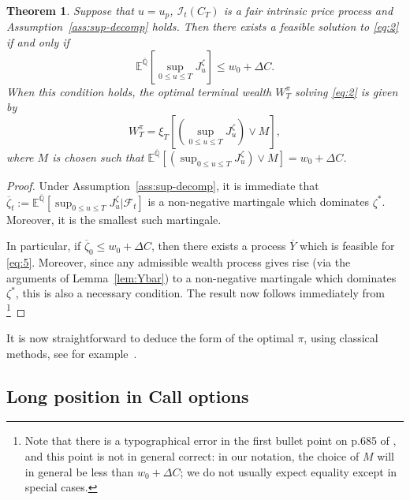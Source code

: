 \documentclass[a4paper]{amsart}
\newtheorem{theorem}{Theorem}[section]
\theoremstyle{definition}
\theoremstyle{remark}
\numberwithin{equation}{section}
\newcommand{\E}{\mathbb{E}}
\newcommand{\Fc}{\mathcal{F}}
\newcommand{\Ebq}[1]{\E^{\bQ}\left[#1\right]}
\newcommand{\ol}{\overline}
\newcommand{\In}{\mathcal{I}} %
\newcommand{\bQ}{\ol{\mathbb{Q}}}
\begin{document}
\begin{theorem} \label{thm:main_decomp}
  Suppose that $u = u_p$, $\In_t(C_T)$ is a fair intrinsic price process and Assumption~\ref{ass:sup-decomp} holds. Then there exists a feasible solution to \eqref{eq:2} if and only if
  \begin{equation*}
    \Ebq{\sup_{0 \le u \le T} J_u^\zeta} \le w_0 + \Delta C .
  \end{equation*}
  When this condition holds, the optimal terminal wealth $W_T^\pi$ solving \eqref{eq:2} is given by
  \begin{equation*}
    W_T^\pi = \xi_T\left[ \left( \sup_{0 \le u \le T} J_u^\zeta\right) \vee M\right],
  \end{equation*}
  where $M$ is chosen such that $\Ebq{\left( \sup_{0 \le u \le T} J_u^\zeta\right) \vee M} = w_0 + \Delta C$.
\end{theorem}

\begin{proof}
  Under Assumption~\ref{ass:sup-decomp}, it is immediate that $\ol{\zeta}_t := \Ebq{\sup_{0 \le u \le T} J_u^\zeta|\Fc_t}$ is a non-negative martingale which dominates $\zeta^*$. Moreover, it is the smallest such martingale. 
  
  In particular, if $\ol{\zeta}_0  \le w_0 + \Delta C$, then there exists a process $\ol{Y}$ which is feasible for \eqref{eq:5}. Moreover, since any admissible wealth process gives rise (via the arguments of Lemma~\ref{lem:Ybar}) to a non-negative martingale which dominates $\zeta^*$, this is also a necessary condition. The result now follows immediately from \cite[Theorem~5.2]{El-Karoui:2008aa} \footnote{Note that there is a typographical error in the first bullet point on p.685 of \cite{El-Karoui:2008aa}, and this point is not in general correct: in our notation, the choice of $M$ will in general be less than $w_0 + \Delta C$; we do not usually expect equality except in special cases.}
\end{proof}

It is now straightforward to deduce the form of the optimal $\pi$, using classical methods, see for example~\cite[Theorem~6.3, Corollary~6.5]{karatzas_methods_1998}.

\subsection{Long position in Call options}
\end{document}
